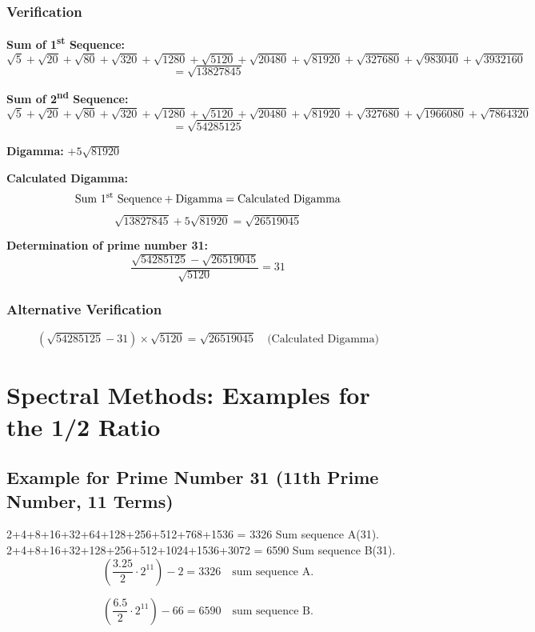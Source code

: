 \documentclass[a4paper,11pt]{article}
\begin{document}
\subsubsection{Verification}

\textbf{Sum of 1\textsuperscript{st} Sequence:}
\[
\sqrt{5} + \sqrt{20} + \sqrt{80} + \sqrt{320} + \sqrt{1280} + \sqrt{5120} + \sqrt{20480} + \sqrt{81920} + \sqrt{327680} + \sqrt{983040} + \sqrt{3932160}
\]
\[
= \sqrt{13827845}
\]

\textbf{Sum of 2\textsuperscript{nd} Sequence:}
\[
\sqrt{5} + \sqrt{20} + \sqrt{80} + \sqrt{320} + \sqrt{1280} + \sqrt{5120} + \sqrt{20480} + \sqrt{81920} + \sqrt{327680} + \sqrt{1966080} + \sqrt{7864320}
\]
\[
= \sqrt{54285125}
\]

\textbf{Digamma:} $+5\sqrt{81920}$

\textbf{Calculated Digamma:}
\[
\text{Sum 1\textsuperscript{st} Sequence} + \text{Digamma} = \text{Calculated Digamma}
\]
\[
\sqrt{13827845} + 5\sqrt{81920} = \sqrt{26519045}
\]

\textbf{Determination of prime number 31:}
\[
\frac{\sqrt{54285125} - \sqrt{26519045}}{\sqrt{5120}} = 31
\]

\subsubsection{Alternative Verification}
\[
(\sqrt{54285125} - 31) \times \sqrt{5120} = \sqrt{26519045} \quad \text{(Calculated Digamma)}
\]

\section*{Spectral Methods: Examples for the 1/2 Ratio}

\subsection*{Example for Prime Number 31 (11th Prime Number, 11 Terms)}

2+4+8+16+32+64+128+256+512+768+1536 = 3326 Sum sequence A(31).\\
2+4+8+16+32+128+256+512+1024+1536+3072 = 6590 Sum sequence B(31).\\

\[
\left(\frac{3.25}{2} \cdot 2^{11}\right) - 2 = 3326 \quad \text{sum sequence A.}
\]

\[
\left(\frac{6.5}{2} \cdot 2^{11}\right) - 66 = 6590 \quad \text{sum sequence B.}
\]
\end{document}
